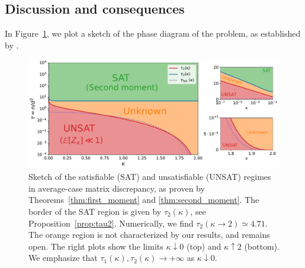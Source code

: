 \subsection{Discussion and consequences}\label{subsec:discussion}

In Figure~\ref{fig:phase_diagram}, we plot a sketch of the phase diagram of the problem, as established by . 
\begin{figure}[!t]
    \centering
    \includegraphics[width=1.0\textwidth]{figures/phase_diagram.pdf}
    \caption{
        Sketch of the satisfiable (SAT) and unsatisfiable (UNSAT) regimes in average-case matrix discrepancy, 
        as proven by Theorems~\ref{thm:first_moment} and \ref{thm:second_moment}. 
        The border of the SAT region is given by $\tau_2(\kappa)$, see Proposition~\ref{prop:tau2}. 
        Numerically, we find $\tau_2(\kappa \to 2) \simeq 4.71$.
        The orange region is not characterized by our results, and remains open.
        The right plots show the limits $\kappa \downarrow 0$ (top) and $\kappa \uparrow 2$ (bottom).
        We emphasize that $\tau_1(\kappa), \tau_2(\kappa) \to +\infty$ as $\kappa \downarrow 0$.
    \label{fig:phase_diagram}}
\end{figure}

